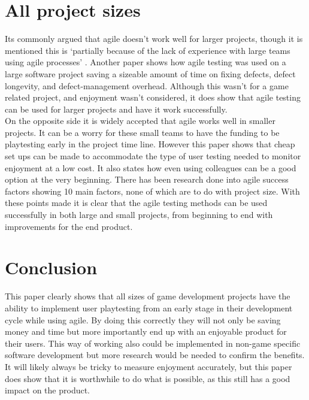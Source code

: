 \documentclass{scrartcl}
\begin{document}
	\section{All project sizes}
	Its commonly argued that agile doesn't work well for larger projects, though it is mentioned this is `partially because of the lack of experience with large teams using agile processes' \cite[p.18]{eckstein2013agile}. Another paper \cite{talby2006agile} shows how agile testing was used on a large software project saving a sizeable amount of time on fixing defects, defect longevity, and defect-management overhead. Although this wasn't for a game related project, and enjoyment wasn't considered, it does show that agile testing can be used for larger projects and have it work successfully.\\ On the opposite side it is widely accepted that agile works well in smaller projects. It can be a worry for these small teams to have the funding to be playtesting early in the project time line. However this paper \cite{moosajee2016games} shows that cheap set ups can be made to accommodate the type of user testing needed to monitor enjoyment at a low cost. It also states how even using colleagues can be a good option at the very beginning. There has been research done into agile success factors \cite{chow2008survey} showing 10 main factors, none of which are to do with project size. With these points made it is clear that the agile testing methods can be used successfully in both large and small projects, from beginning to end with improvements for the end product.
	
	
	\section{Conclusion}
	
	This paper clearly shows that all sizes of game development projects have the ability to implement user playtesting from an early stage in their development cycle while using agile. By doing this correctly they will not only be saving money and time but more importantly end up with an enjoyable product for their users. This way of working also could be implemented in non-game specific software development but more research would be needed to confirm the benefits. It will likely always be tricky to measure enjoyment accurately, but this paper does show that it is worthwhile to do what is possible, as this still has a good impact on the product.
	
	
	
	
	
\end{document}
